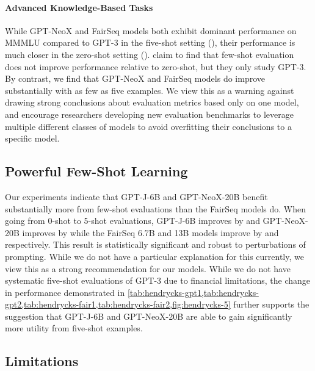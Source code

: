 \documentclass[11pt]{article}
\newcommand{\model}{GPT-NeoX-20B}
\begin{document}
\paragraph{Advanced Knowledge-Based Tasks} While GPT-NeoX and FairSeq models both exhibit dominant performance on MMMLU compared to GPT-3 in the five-shot setting (), their performance is much closer in the zero-shot setting (). \citet{hendrycks2021measuring} claim to find that few-shot evaluation does not improve performance relative to zero-shot, but they only study GPT-3. By contrast, we find that GPT-NeoX and FairSeq models do improve substantially with as few as five examples. We view this as a warning against drawing strong conclusions about evaluation metrics based only on one model, and encourage researchers developing new evaluation benchmarks to leverage multiple different classes of models to avoid overfitting their conclusions to a specific model.

\subsection{Powerful Few-Shot Learning}

Our experiments indicate that GPT-J-6B and \model{} benefit substantially more from few-shot evaluations than the FairSeq models do. When going from 0-shot to 5-shot evaluations, GPT-J-6B improves by  and \model{} improves by  while the FairSeq 6.7B and 13B models improve by  and  respectively. This result is statistically significant and robust to perturbations of prompting. While we do not have a particular explanation for this currently, we view this as a strong recommendation for our models. While we do not have systematic five-shot evaluations of GPT-3 due to financial limitations, the change in performance demonstrated in \cref{tab:hendrycks-gpt1,tab:hendrycks-gpt2,tab:hendrycks-fair1,tab:hendrycks-fair2,fig:hendrycks-5} further supports the suggestion that GPT-J-6B and GPT-NeoX-20B are able to gain significantly more utility from five-shot examples.

\subsection{Limitations}
\end{document}
